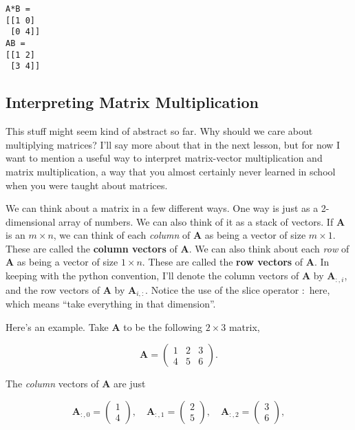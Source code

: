 \documentclass[
  letterpaper,
  DIV=11,
  numbers=noendperiod]{scrreprt}
\begin{document}
\begin{verbatim}
A*B = 
[[1 0]
 [0 4]]
AB = 
[[1 2]
 [3 4]]
\end{verbatim}

\hypertarget{interpreting-matrix-multiplication}{%
\subsection{Interpreting Matrix
Multiplication}\label{interpreting-matrix-multiplication}}

This stuff might seem kind of abstract so far. Why should we care about
multiplying matrices? I'll say more about that in the next lesson, but
for now I want to mention a useful way to interpret matrix-vector
multiplication and matrix multiplication, a way that you almost
certainly never learned in school when you were taught about matrices.

We can think about a matrix in a few different ways. One way is just as
a 2-dimensional array of numbers. We can also think of it as a stack of
vectors. If \(\mathbf{A}\) is an \(m \times n\), we can think of each
\emph{column} of \(\mathbf{A}\) as being a vector of size
\(m \times 1\). These are called the \textbf{column vectors} of
\(\mathbf{A}\). We can also think about each \emph{row} of
\(\mathbf{A}\) as being a vector of size \(1 \times n\). These are
called the \textbf{row vectors} of \(\mathbf{A}\). In keeping with the
python convention, I'll denote the column vectors of \(\mathbf{A}\) by
\(\mathbf{A}_{:, i}\), and the row vectors of \(\mathbf{A}\) by
\(\mathbf{A}_{i, :}\). Notice the use of the slice operator \(:\) here,
which means ``take everything in that dimension''.

Here's an example. Take \(\mathbf{A}\) to be the following
\(2 \times 3\) matrix,

\[
\mathbf{A} = 
\begin{pmatrix}
1 & 2 & 3 \\
4 & 5 & 6
\end{pmatrix}.
\]

The \emph{column} vectors of \(\mathbf{A}\) are just

\[\mathbf{A}_{:, 0} = \begin{pmatrix} 1 \\ 4 \end{pmatrix}, \quad \mathbf{A}_{:, 1} = \begin{pmatrix} 2 \\ 5 \end{pmatrix}, \quad \mathbf{A}_{:, 2} = \begin{pmatrix} 3 \\ 6 \end{pmatrix},\]
\end{document}
